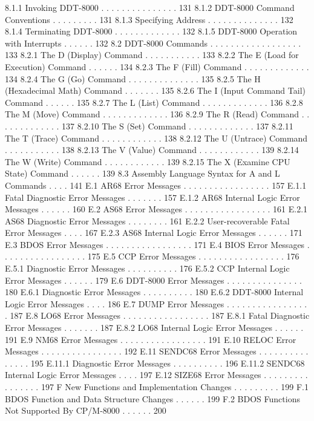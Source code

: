        8.1.1  Invoking DDT-8000 . . . . . . . . . . . . . . . 131 
        8.1.2  DDT-8000 Command Conventions  . . . . . . . . . 131 
        8.1.3  Specifying Address . . . . . . . . . . . . . . 132 
        8.1.4  Terminating DDT-8000  . . . . . . . . . . . . . 132 
        8.1.5  DDT-8000 Operation with Interrupts  . . . . . . 132 
   8.2  DDT-8000 Commands  . . . . . . . . . . . . . . . . . . 133 
        8.2.1  The D (Display) Command  . . . . . . . . . . . 133 
        8.2.2  The E (Load for Execution) Command . . . . . . 134 
        8.2.3  The F (Fill) Command . . . . . . . . . . . . . 134 
        8.2.4  The G (Go) Command . . . . . . . . . . . . . . 135 
        8.2.5  The H (Hexadecimal Math) Command . . . . . . . 135 
        8.2.6  The I (Input Command Tail) Command . . . . . . 135 
        8.2.7  The L (List) Command . . . . . . . . . . . . . 136 
        8.2.8  The M (Move) Command . . . . . . . . . . . . . 136 
        8.2.9  The R (Read) Command . . . . . . . . . . . . . 137 
        8.2.10  The S (Set) Command . . . . . . . . . . . . . 137 
        8.2.11  The T (Trace) Command . . . . . . . . . . . . 138 
        8.2.12  The U (Untrace) Command . . . . . . . . . . . 138 
        8.2.13  The V (Value) Command . . . . . . . . . . . . 139 
        8.2.14  The W (Write) Command . . . . . . . . . . . . 139 
        8.2.15  The X (Examine CPU State) Command . . . . . . 139 
   8.3  Assembly Language Syntax for A and L Commands . . . . 141 
   E.1  AR68 Error Messages . . . . . . . . . . . . . . . . . 157 
        E.1.1  Fatal Diagnostic Error Messages  . . . . . . . 157 
        E.1.2  AR68 Internal Logic Error Messages . . . . . . 160 
   E.2  AS68 Error Messages . . . . . . . . . . . . . . . . . 161 
        E.2.1  AS68 Diagnostic Error Messages . . . . . . . . 161 
        E.2.2  User-recoverable Fatal Error Messages  . . . . 167 
        E.2.3  AS68 Internal Logic Error Messages . . . . . . 171 
   E.3  BDOS Error Messages . . . . . . . . . . . . . . . . . 171 
   E.4  BIOS Error Messages . . . . . . . . . . . . . . . . . 175 
   E.5  CCP Error Messages  . . . . . . . . . . . . . . . . . 176 
        E.5.1  Diagnostic Error Messages  . . . . . . . . . . 176 
        E.5.2  CCP Internal Logic Error Messages  . . . . . . 179 
   E.6  DDT-8000 Error Messages  . . . . . . . . . . . . . . . 180 
        E.6.1  Diagnostic Error Messages  . . . . . . . . . . 180 
        E.6.2  DDT-8000 Internal Logic Error Messages  . . . . 186 
   E.7  DUMP Error Messages . . . . . . . . . . . . . . . . . 187 
   E.8  LO68 Error Messages . . . . . . . . . . . . . . . . . 187 
        E.8.1  Fatal Diagnostic Error Messages  . . . . . . . 187 
        E.8.2  LO68 Internal Logic Error Messages . . . . . . 191 
   E.9  NM68 Error Messages . . . . . . . . . . . . . . . . . 191 
   E.10 RELOC Error Messages  . . . . . . . . . . . . . . . . 192 
   E.11 SENDC68 Error Messages  . . . . . . . . . . . . . . . 195 
        E.11.1  Diagnostic Error Messages . . . . . . . . . . 196 
        E.11.2  SENDC68 Internal Logic Error Messages . . . . 197 
   E.12 SIZE68 Error Messages . . . . . . . . . . . . . . . . 197 
F  New Functions and Implementation Changes . . . . . . . . . 199 
   F.1  BDOS Function and Data Structure Changes  . . . . . . 199 
   F.2  BDOS Functions Not Supported By CP/M-8000  . . . . . . 200 
